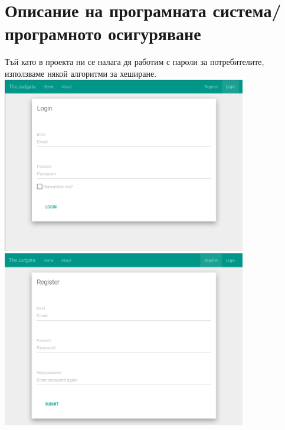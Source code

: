 \documentclass[12pt]{article}
\begin{document}
	\section{Описание на програмната система/програмното осигуряване} 
	Тъй като в проекта ни се налага дя работим с пароли за потребителите, използваме някой алгоритми за хеширане. \\ \vspace {0.5cm}
	\includegraphics[width=0.80\textwidth]{login} \\ \vspace {0.5cm}
	\includegraphics[width=0.80\textwidth]{register}
	\newpage
\end{document}
